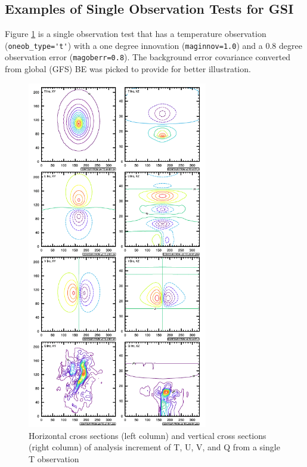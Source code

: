 \subsection{Examples of Single Observation Tests for GSI}

Figure \ref{fig:singleobs} is a single observation test that has a temperature observation (\verb|oneob_type='t'|) with a one degree innovation (\verb|maginnov=1.0|) and a 0.8 degree observation error (\verb|magoberr=0.8|). The background error covariance converted from global (GFS) BE was picked to provide for better illustration.

\begin{figure}[h!]
  \centering
  \includegraphics[width=0.7\textwidth]{images/SingleObs}
  \caption{Horizontal cross sections (left column) and vertical cross sections (right column) of analysis increment of T, U, V, and Q from a single T observation}
  \label{fig:singleobs}
\end{figure}

